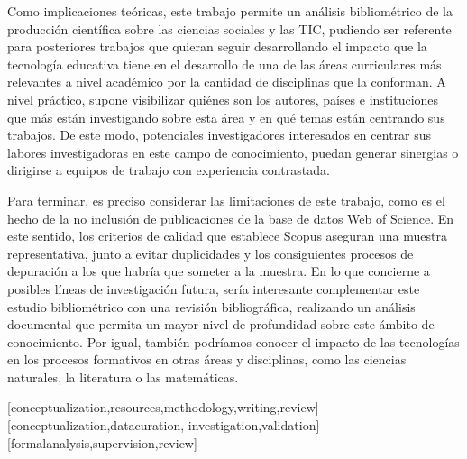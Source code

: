 \documentclass[spanish]{textolivre}
\begin{document}
Como implicaciones teóricas, este trabajo permite un análisis bibliométrico de la producción científica sobre las ciencias sociales y las TIC, pudiendo ser referente para posteriores trabajos que quieran seguir desarrollando el impacto que la tecnología educativa tiene en el desarrollo de una de las áreas curriculares más relevantes a nivel académico por la cantidad de disciplinas que la conforman. A nivel práctico, supone visibilizar quiénes son los autores, países e instituciones que más están investigando sobre esta área y en qué temas están centrando sus trabajos. De este modo, potenciales investigadores interesados en centrar sus labores investigadoras en este campo de conocimiento, puedan generar sinergias o dirigirse a equipos de trabajo con experiencia contrastada.

Para terminar, es preciso considerar las limitaciones de este trabajo, como es el hecho de la no inclusión de publicaciones de la base de datos Web of Science. En este sentido, los criterios de calidad que establece Scopus aseguran una muestra representativa, junto a evitar duplicidades y los consiguientes procesos de depuración a los que habría que someter a la muestra. En lo que concierne a posibles líneas de investigación futura, sería interesante complementar este estudio bibliométrico con una revisión bibliográfica, realizando un análisis documental que permita un mayor nivel de profundidad sobre este ámbito de conocimiento. Por igual, también podríamos conocer el impacto de las tecnologías en los procesos formativos en otras áreas y disciplinas, como las ciencias naturales, la literatura o las matemáticas.



\printbibliography\label{sec-bib}


\begin{contributors}
[conceptualization,resources,methodology,writing,review]
[conceptualization,datacuration, investigation,validation]
[formalanalysis,supervision,review]
\end{contributors}
\end{document}
